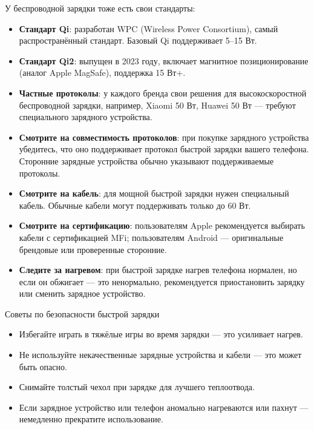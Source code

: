 У беспроводной зарядки тоже есть свои стандарты:

\begin{itemize}
  \item \textbf{Стандарт Qi}: разработан WPC (Wireless Power Consortium), самый распространённый стандарт. Базовый Qi поддерживает 5–15 Вт.
  \item \textbf{Стандарт Qi2}: выпущен в 2023 году, включает магнитное позиционирование (аналог Apple MagSafe), поддержка 15 Вт+.
  \item \textbf{Частные протоколы}: у каждого бренда свои решения для высокоскоростной беспроводной зарядки, например, Xiaomi 50 Вт, Huawei 50 Вт — требуют специального зарядного устройства.
\end{itemize}


\begin{itemize}
  \item \textbf{Смотрите на совместимость протоколов}: при покупке зарядного устройства убедитесь, что оно поддерживает протокол быстрой зарядки вашего телефона. Сторонние зарядные устройства обычно указывают поддерживаемые протоколы.
  \item \textbf{Смотрите на кабель}: для мощной быстрой зарядки нужен специальный кабель. Обычные кабели могут поддерживать только до 60 Вт.
  \item \textbf{Смотрите на сертификацию}: пользователям Apple рекомендуется выбирать кабели с сертификацией MFi; пользователям Android — оригинальные брендовые или проверенные сторонние.
  \item \textbf{Следите за нагревом}: при быстрой зарядке нагрев телефона нормален, но если он обжигает — это ненормально, рекомендуется приостановить зарядку или сменить зарядное устройство.
\end{itemize}

\begin{tcbwarn}{Советы по безопасности быстрой зарядки}
\begin{itemize}
  \item Избегайте играть в тяжёлые игры во время зарядки — это усиливает нагрев.
  \item Не используйте некачественные зарядные устройства и кабели — это может быть опасно.
  \item Снимайте толстый чехол при зарядке для лучшего теплоотвода.
  \item Если зарядное устройство или телефон аномально нагреваются или пахнут — немедленно прекратите использование.
\end{itemize}

\end{tcbwarn}


